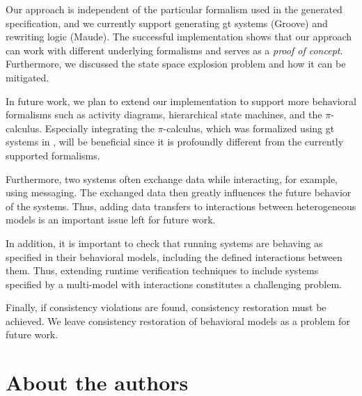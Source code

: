 \documentclass{jot}
\begin{document}
Our approach is independent of the particular formalism used in the generated specification, and we currently support generating \gls*{gt} systems (Groove) and rewriting logic (Maude).
The successful implementation shows that our approach can work with different underlying formalisms and serves as a \emph{proof of concept}.
Furthermore, we discussed the state space explosion problem and how it can be mitigated.

In future work, we plan to extend our implementation to support more behavioral formalisms such as activity diagrams, hierarchical state machines, and the $\pi$-calculus.
Especially integrating the $\pi$-calculus, which was formalized using \gls*{gt} systems in \cite{gadducciGraphRewritingPcalculus2007}, will be beneficial since it is profoundly different from the currently supported formalisms.

Furthermore, two systems often exchange data while interacting, for example, using messaging.
The exchanged data then greatly influences the future behavior of the systems.
Thus, adding data transfers to interactions between heterogeneous models is an important issue left for future work.

In addition, it is important to check that running systems are behaving as specified in their behavioral models, including the defined interactions between them.
Thus, extending runtime verification techniques to include systems specified by a multi-model with interactions constitutes a challenging problem.

Finally, if consistency violations are found, consistency restoration must be achieved.
We leave consistency restoration of behavioral models as a problem for future work.




\section*{About the authors}

\end{document}
